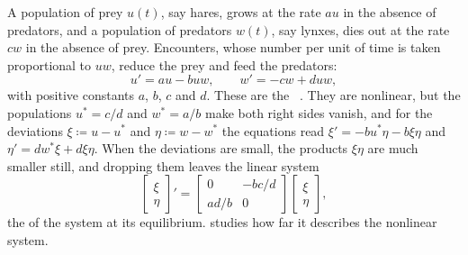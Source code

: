 A population of prey $u(t)$, say hares, grows at the rate $au$ in the absence of predators, and a population of predators $w(t)$, say lynxes, dies out at the rate $cw$ in the absence of prey. Encounters, whose number per unit of time is taken proportional to $uw$, reduce the prey and feed the predators:
\begin{equation}
u'=au-buw,\qquad w'=-cw+duw ,
\label{eq:lotka-volterra}
\end{equation}
with positive constants $a$, $b$, $c$ and $d$. These are the ~\cite{lotka1925,volterra1926}. They are nonlinear, but the populations $u^*=c/d$ and $w^*=a/b$ make both right sides vanish, and for the deviations $\xi\coloneqq u-u^*$ and $\eta\coloneqq w-w^*$ the equations read $\xi'=-bu^*\eta-b\xi\eta$ and $\eta'=dw^*\xi+d\xi\eta$. When the deviations are small, the products $\xi\eta$ are much smaller still, and dropping them leaves the linear system
\[
\begin{bmatrix}\xi\\\eta\end{bmatrix}'=\begin{bmatrix}0&-bc/d\\ad/b&0\end{bmatrix}\begin{bmatrix}\xi\\\eta\end{bmatrix},
\]
the  of the system at its equilibrium.  studies how far it describes the nonlinear system.

